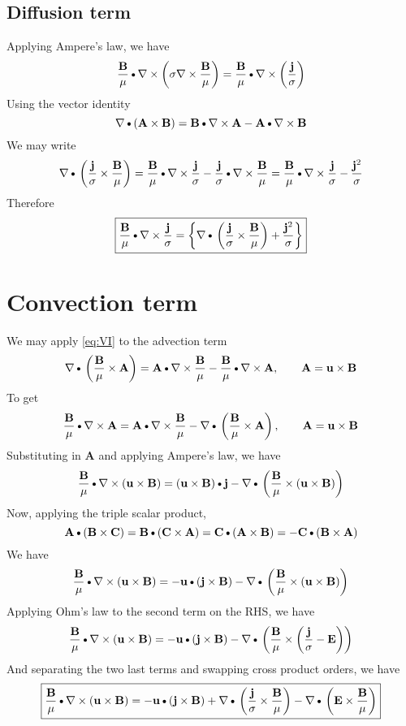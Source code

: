 \documentclass[11pt]{article}
\newcommand{\A}{\mathbf{A}}
\newcommand{\B}{\mathbf{B}}
\renewcommand{\C}{\mathbf{C}}
\newcommand{\BM}{\frac{\mathbf{B}}{\mu}}
\newcommand{\J}{\mathbf{j}}
\newcommand{\E}{\mathbf{E}}
\newcommand{\JS}{\frac{\mathbf{j}}{\sigma}}
\newcommand{\JSS}{\frac{\mathbf{j}^2}{\sigma}}
\renewcommand{\U}{\mathbf{u}}
\newcommand{\SI}{\sigma}
\newcommand{\DOT}{\text{\textbullet}}
\begin{document}
\subsection{Diffusion term}
Applying Ampere's law, we have
\begin{equation}
	\BM \DOT \nabla \times \left( \SI \nabla \times \BM \right) = \BM \DOT \nabla \times \left( \JS \right)
\end{equation}
Using the vector identity
\begin{equation} \label{eq:VI}
	\nabla \DOT (\A \times \B) = \B \DOT \nabla \times \A - \A \DOT \nabla \times \B
\end{equation}
We may write
\begin{equation}
	\nabla \DOT \left(\JS \times \BM \right) =
	\BM \DOT \nabla \times \JS - \JS \DOT \nabla \times \BM =
	\BM \DOT \nabla \times \JS - \JSS
\end{equation}
Therefore
\begin{equation}
	\boxed{
	\BM \DOT \nabla \times \JS =
	\left\{ \nabla \DOT \left(\JS \times \BM \right) + \JSS \right\}
	}
\end{equation}
\section{Convection term}
We may apply \ref{eq:VI} to the advection term
\begin{equation}
	\nabla \DOT \left(\BM \times \A \right) = \A \DOT \nabla \times \BM - \BM \DOT \nabla \times \A, \qquad \A = \U \times \B
\end{equation}
To get
\begin{equation}
	\BM \DOT \nabla \times \A = \A \DOT \nabla \times \BM - \nabla \DOT \left(\BM \times \A \right), \qquad \A = \U \times \B
\end{equation}
Substituting in $\A$ and applying Ampere's law, we have
\begin{equation}
	\BM \DOT \nabla \times (\U \times \B) = (\U \times \B) \DOT \J - \nabla \DOT \left(\BM \times (\U \times \B) \right)
\end{equation}
Now, applying the triple scalar product,
\begin{equation}
	\A \DOT (\B \times \C) = \B \DOT (\C \times \A) = \C \DOT (\A \times \B) = - \C \DOT (\B \times \A)
\end{equation}
We have
\begin{equation}
	\BM \DOT \nabla \times (\U \times \B) = -\U \DOT (\J \times \B) - \nabla \DOT \left(\BM \times (\U \times \B) \right)
\end{equation}
Applying Ohm's law to the second term on the RHS, we have
\begin{equation}
	\BM \DOT \nabla \times (\U \times \B) = -
	\U \DOT (\J \times \B) -
	\nabla \DOT \left(\BM \times \left(\JS - \E \right) \right)
\end{equation}
And separating the two last terms and swapping cross product orders, we have
\begin{equation}
	\boxed{
	\BM \DOT \nabla \times (\U \times \B) = -
	\U \DOT (\J \times \B) +
	\nabla \DOT \left(\JS \times \BM \right) -
	\nabla \DOT \left(\E \times \BM \right)
	}
\end{equation}
\end{document}
